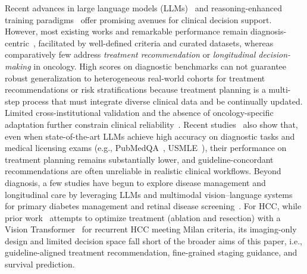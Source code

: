 \documentclass{article}
\begin{document}
Recent advances in large language models (LLMs)~\cite{Brown2020GPT3,OpenAI2023GPT4} and reasoning-enhanced training paradigms~\cite{ouyang2022training,wei2022chain,shao_deepseekmath_2024} offer promising avenues for clinical decision support. However, most existing works and remarkable performance remain diagnosis-centric~\cite{BioMedLM,BioGPT,MedPaLM,MedPaLM2,liu2025generalist}, facilitated by well-defined criteria and curated datasets, whereas comparatively few address \emph{treatment recommendation} or \emph{longitudinal decision-making} in oncology. High scores on diagnostic benchmarks can not guarantee robust generalization to heterogeneous real-world cohorts for treatment recommendations or risk stratifications because treatment planning is a multi-step process that must integrate diverse clinical data and be continually updated. Limited cross-institutional validation and the absence of oncology-specific adaptation further constrain clinical reliability~\cite{zhu2025large}. Recent studies~\cite{qiu2025quantifying,hager2024evaluation} also show that, even when state-of-the-art LLMs achieve high accuracy on diagnostic tasks and medical licensing exams (e.g., PubMedQA~\cite{jin2019pubmedqa}, USMLE~\cite{kung2023performance}), their performance on treatment planning remains substantially lower, and guideline-concordant recommendations are often unreliable in realistic clinical workflows. 
Beyond diagnosis, a few studies have begun to explore disease management and longitudinal care by leveraging LLMs and multimodal vision–language systems for primary diabetes management and retinal disease screening~\cite{li2024integrated,wu2025eyecare}. For HCC, while prior work~\cite{HEROVision} attempts to optimize treatment (ablation and resection) with a Vision Transformer~\cite{DosovitskiyB0WZ21} for recurrent HCC meeting Milan criteria, its imaging-only design and limited decision space fall short of the broader aims of this paper, i.e., guideline-aligned treatment recommendation, fine-grained staging guidance, and survival prediction.
\end{document}
